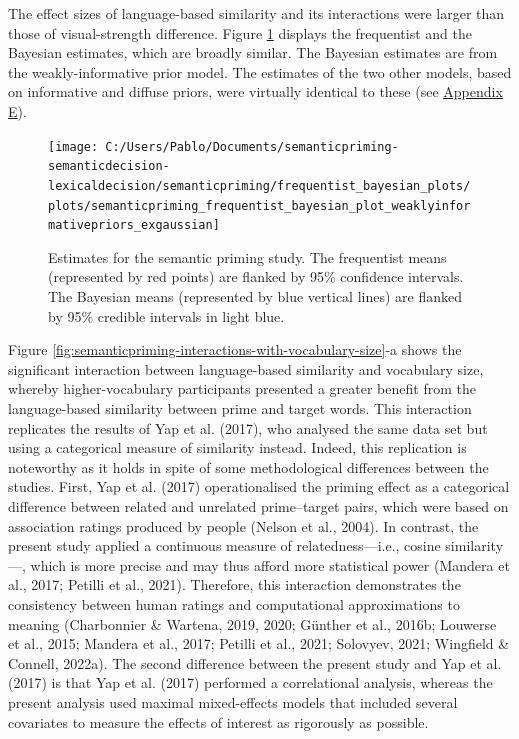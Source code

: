 \documentclass[
  12pt,
  man,floatsintext]{apa7}
\begin{document}
The effect sizes of language-based similarity and its interactions were larger than those of visual-strength difference. Figure \ref{fig:semanticpriming-frequentist-bayesian-plot-weaklyinformativepriors-exgaussian} displays the frequentist and the Bayesian estimates, which are broadly similar. The Bayesian estimates are from the weakly-informative prior model. The estimates of the two other models, based on informative and diffuse priors, were virtually identical to these (see \protect\hyperlink{appendix-E-Bayesian-analysis-results}{\underline{Appendix E}}).

\FloatBarrier

\begin{figure}

{\centering \texttt{[image: C:/Users/Pablo/Documents/semanticpriming-semanticdecision-lexicaldecision/semanticpriming/frequentist\_bayesian\_plots/plots/semanticpriming\_frequentist\_bayesian\_plot\_weaklyinformativepriors\_exgaussian]} 

}

\caption{Estimates for the semantic priming study. The frequentist means (represented by red points) are flanked by 95\% confidence intervals. The Bayesian means (represented by blue vertical lines) are flanked by 95\% credible intervals in light blue.}\label{fig:semanticpriming-frequentist-bayesian-plot-weaklyinformativepriors-exgaussian}
\end{figure}

Figure \ref{fig:semanticpriming-interactions-with-vocabulary-size}-a shows the significant interaction between language-based similarity and vocabulary size, whereby higher-vocabulary participants presented a greater benefit from the language-based similarity between prime and target words. This interaction replicates the results of Yap et al. (2017), who analysed the same data set but using a categorical measure of similarity instead. Indeed, this replication is noteworthy as it holds in spite of some methodological differences between the studies. First, Yap et al. (2017) operationalised the priming effect as a categorical difference between related and unrelated prime--target pairs, which were based on association ratings produced by people (Nelson et al., 2004). In contrast, the present study applied a continuous measure of relatedness---i.e., cosine similarity---, which is more precise and may thus afford more statistical power (Mandera et al., 2017; Petilli et al., 2021). Therefore, this interaction demonstrates the consistency between human ratings and computational approximations to meaning (Charbonnier \& Wartena, 2019, 2020; Günther et al., 2016b; Louwerse et al., 2015; Mandera et al., 2017; Petilli et al., 2021; Solovyev, 2021; Wingfield \& Connell, 2022a). The second difference between the present study and Yap et al. (2017) is that Yap et al. (2017) performed a correlational analysis, whereas the present analysis used maximal mixed-effects models that included several covariates to measure the effects of interest as rigorously as possible.
\end{document}

